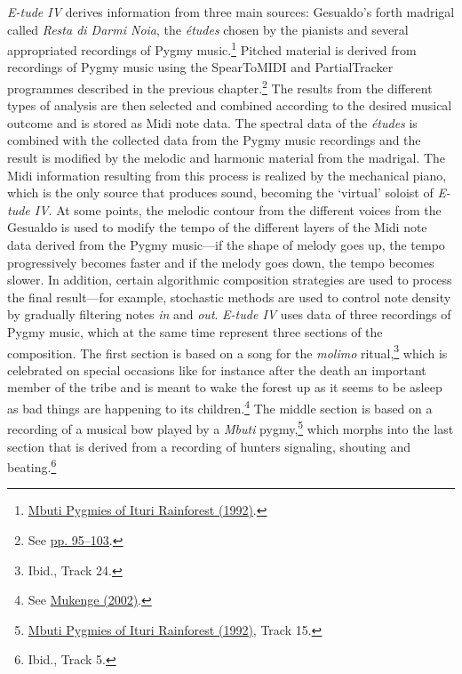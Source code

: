 \emph{E-tude IV} derives information from three main sources: Gesualdo's forth madrigal called \emph{Resta di Darmi Noia}, the \emph{\'{e}tudes} chosen by the pianists and several appropriated recordings of Pygmy music.\footnote{\hyperlink{pygmy}{Mbuti Pygmies of Ituri Rainforest (1992)}.} Pitched material is derived from recordings of Pygmy music using the SpearToMIDI and PartialTracker programmes described in the previous chapter.\footnote{See \hyperlink{spectrack}{pp. 95--103}.} The results from the different types of analysis are then selected and combined according to the desired musical outcome and is stored as Midi note data. The spectral data of the \emph{\'{e}tudes} is combined with the collected data from the Pygmy music recordings and the result is modified by the melodic and harmonic material from the madrigal. The Midi information resulting from this process is realized by the mechanical piano, which is the only source that produces sound, becoming the `virtual' soloist of \emph{E-tude IV}. At some points, the melodic contour from the different voices from the Gesualdo is used to modify the tempo of the different layers of the Midi note data derived from the Pygmy music---if the shape of melody goes up, the tempo progressively becomes faster and if the melody goes down, the tempo becomes slower. In addition, certain algorithmic composition strategies are used to process the final result---for example, stochastic methods are used to control note density by gradually filtering notes \emph{in} and \emph{out}. \emph{E-tude IV} uses data of three recordings of Pygmy music, which at the same time represent three sections of the composition. The first section is based on a song for the \emph{molimo} ritual,\footnote{Ibid., Track 24.} which is celebrated on special occasions like for instance after the death an important member of the tribe and is meant to wake the forest up as it seems to be asleep as bad things are happening to its children.\footnote{See \hyperlink{mukenge}{Mukenge (2002)}.} The middle section is based on a recording of a musical bow played by a \emph{Mbuti} pygmy,\footnote{\hyperlink{pygmy}{Mbuti Pygmies of Ituri Rainforest (1992)}, Track 15.} which morphs into the last section that is derived from a recording of hunters signaling, shouting and beating.\footnote{Ibid., Track 5.}


